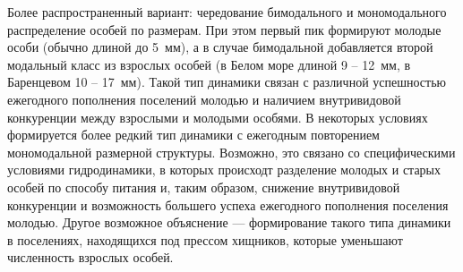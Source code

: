 \begin{enumerate}
Более распространенный вариант: чередование бимодального и мономодального распределение особей по размерам. При этом первый пик формируют молодые особи (обычно длиной до 5~мм), а в случае бимодальной добавляется второй модальный класс из взрослых особей (в Белом море длиной 9 -- 12~мм, в Баренцевом 10 -- 17~мм). Такой тип динамики связан с различной успешностью ежегодного пополнения поселений молодью и наличием внутривидовой конкуренции между взрослыми и молодыми особями.
В некоторых условиях формируется более редкий тип динамики с ежегодным повторением мономодальной размерной структуры. Возможно, это связано со специфическими условиями гидродинамики, в которых происходт разделение молодых и старых особей по способу питания и, таким образом, снижение внутривидовой конкуренции и возможность большего успеха ежегодного пополнения поселения молодью. Другое возможное объяснение --- формирование такого типа динамики в поселениях, находящихся под прессом хищников, которые уменьшают численность взрослых особей.
	\end{enumerate}

